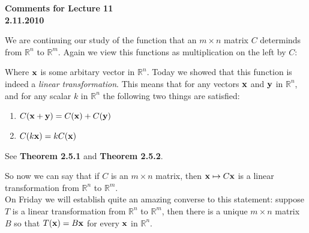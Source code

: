 \documentclass[12pt]{article}
\begin{document}
\begin{center}
{\large \bf Comments for Lecture 11}\\
\bf{2.11.2010}
\end{center}


\noindent We are continuing our study of the function that an $m \times n$ matrix $C$ determinds from $\mathbb{R}^n$ to $\mathbb{R}^m$.  Again we view this functions as multiplication on the left by $C$:

\begin{center}
\end{center}

Where ${\bf x}$ is some arbitary vector in $\mathbb{R}^n$.  Today we showed that this function is indeed a {\it linear transformation}.  This means that for any vectors ${\bf x}$ and ${\bf y}$ in $\mathbb{R}^n$, and for any scalar $k$ in $\mathbb{R}^n$ the following two things are satisfied:

\begin{enumerate}
\item $C({\bf x}+{\bf y})=C({\bf x})+C({\bf y})$
\item $C(k{\bf x})=kC({\bf x})$
\end{enumerate}

\noindent See {\bf Theorem 2.5.1} and {\bf Theorem 2.5.2}.

\noindent So now we can say that if $C$ is an $m \times n$ matrix, then ${\bf x}\mapsto C{\bf x}$ is a linear transformation from $\mathbb{R}^n$ to $\mathbb{R}^m$.\\

\noindent On Friday we will establish quite an amazing converse to this statement:  suppose $T$ is a linear transformation from $\mathbb{R}^n$ to $\mathbb{R}^m$, then there is a unique $m \times n$ matrix $B$ so that $T({\bf x})=B{\bf x}$ for every ${\bf x}$ in $\mathbb{R}^n$.




\end{document}
